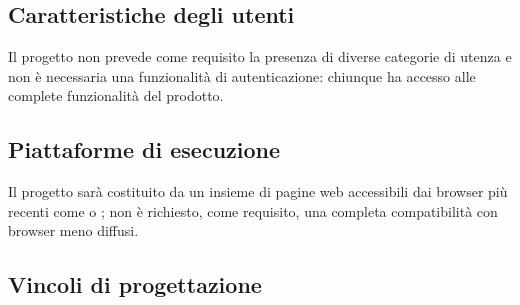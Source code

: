 \subsection{Caratteristiche degli utenti}
Il progetto non prevede come requisito la presenza di diverse categorie di utenza e non è necessaria una funzionalità di autenticazione: chiunque ha accesso alle complete funzionalità del prodotto. 
\subsection{Piattaforme di esecuzione}
Il progetto sarà costituito da un insieme di pagine web accessibili dai browser più recenti come  o ; non è richiesto, come requisito, una completa compatibilità con browser meno diffusi.

\newpage

\subsection{Vincoli di progettazione}

